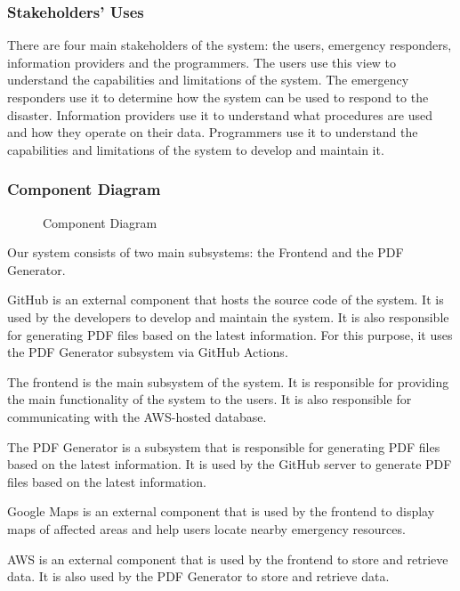 \documentclass[a4paper]{article}
\begin{document}
    \subsubsection{Stakeholders' Uses}
    There are four main stakeholders of the system: the users, emergency responders, information providers and the programmers.
    The users use this view to understand the capabilities and limitations of the system. The emergency responders use it to
    determine how the system can be used to respond to the disaster. Information providers use it to understand what procedures
    are used and how they operate on their data. Programmers use it to understand the capabilities and limitations of the system
    to develop and maintain it.
    \subsubsection{Component Diagram}
    \begin{figure}
        
        \caption{Component Diagram}
    \end{figure}

    Our system consists of two main subsystems: the Frontend and the PDF Generator.

    \begin{itemize*}
        \item GitHub is an external component that hosts the source code of the system. It is used by the developers to develop and maintain the system. It is also responsible for generating PDF files based on the latest information. For this purpose, it uses the PDF Generator subsystem via GitHub Actions.
        \item The frontend is the main subsystem of the system. It is responsible for providing the main functionality of the system to the users. It is also responsible for communicating with the AWS-hosted database.
        \item The PDF Generator is a subsystem that is responsible for generating PDF files based on the latest information. It is used by the GitHub server to generate PDF files based on the latest information.
        \item Google Maps is an external component that is used by the frontend to display maps of affected areas and help users locate nearby emergency resources.
        \item AWS is an external component that is used by the frontend to store and retrieve data. It is also used by the PDF Generator to store and retrieve data.
    \end{itemize*}
\end{document}
